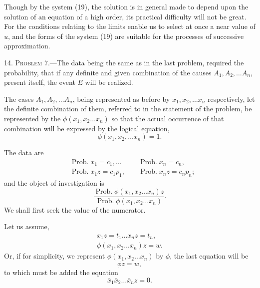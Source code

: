\documentclass[oneside]{book}
\begin{document}
Though by the system (19), the solution is in general made
to depend upon the solution of an equation of a high order, its
practical difficulty will not be great. For the conditions relating
to the limits enable us to select at once a near value of $u$, and
the forms of the system (19) are suitable for the processes of
successive approximation.

14. \textsc{Problem} 7.---The data being the same as in the last
problem, required the probability, that if any definite and given
combination of the causes $A_1, A_2,\dotsc A_n$, present itself, the event
$E$ will be realized.

The cases $A_1, A_2,\dotsc A_n$, being represented as before by
$x_1, x_2, \dotsc x_n$ respectively, let the definite combination of them,
referred to in the statement of the problem, be represented by
the $\phi(x_1, x_2 \dotsc x_n)$ so that the actual occurrence of that
combination will be expressed by the logical equation,
\begin{equation*}
\phi(x_1, x_2, \dotsc x_n)=1.
\end{equation*}

The data are
\begin{equation}\tag{1}\begin{aligned}
&\operatorname{Prob. } x_1 = c_1, \dotsc \; &
&\operatorname{Prob. } x_n = c_n, \\
&\operatorname{Prob. } x_1 z = c_1 p_1, \; &
&\operatorname{Prob. } x_n z = c_n p_n;
\end{aligned}\end{equation}
and the object of investigation is
\begin{equation}\tag{2}
\frac{\operatorname{Prob. } \phi(x_1, x_2\dotsc x_n)z}
     {\operatorname{Prob. } \phi(x_1, x_2\dotsc x_n) }.
\end{equation}
We shall first seek the value of the numerator.

Let us assume,
\begin{gather*}\tag{3}
x_1 z = t_1 \dotsc x_n z = t_n,
\\\tag{4}
\phi(x_1, x_2\dotsc x_n) z = w.
\end{gather*}
Or, if for simplicity, we represent $\phi(x_1, x_2\dotsc x_n)$ by $\phi$, the last
equation will be
\begin{equation}\tag{5}
\phi z = w,
\end{equation}
to which must be added the equation
\begin{equation}\tag{6}
\bar{x}_1 \bar{x}_2 \dotsc \bar{x}_n z = 0.
\end{equation}
\end{document}
